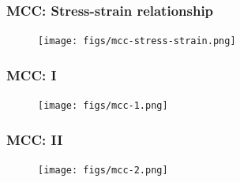 \documentclass[notes]{beamer}
\begin{document}
\begin{frame}
\frametitle{MCC: Stress-strain relationship}
\begin{figure}
	\texttt{[image: figs/mcc-stress-strain.png]}
\end{figure}
\end{frame}

\begin{frame}
\frametitle{MCC: I}
\begin{figure}
	\texttt{[image: figs/mcc-1.png]}
\end{figure}
\end{frame}

\begin{frame}
\frametitle{MCC: II}
\begin{figure}
	\texttt{[image: figs/mcc-2.png]}
\end{figure}
\end{frame}


\end{document}
